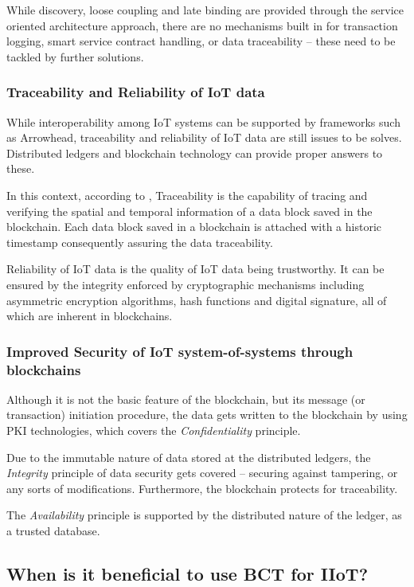 \documentclass[a4paper]{article}
\begin{document}
While discovery, loose coupling and late binding are provided through the service oriented architecture approach, there are no mechanisms built in for transaction logging, smart service contract handling, or data traceability -- these need to be tackled by further solutions.  

\subsubsection{Traceability and Reliability of IoT data}

While interoperability among IoT systems can be supported by frameworks such as Arrowhead, traceability and reliability of IoT data are still issues to be solves. Distributed ledgers and blockchain technology can provide proper answers to these.

In this context, according to \cite{BC_IoT_survey}, Traceability is the capability of tracing and verifying the spatial and temporal information of a data block saved in the blockchain. Each data block saved in a blockchain is attached with a historic timestamp consequently assuring the data traceability. 

Reliability of IoT data \cite{BC_IoT_survey} is the quality of IoT data being trustworthy. It can be ensured by the integrity enforced by cryptographic mechanisms including asymmetric encryption algorithms, hash functions and digital signature, all of which are inherent in blockchains.

\subsubsection{Improved Security of IoT system-of-systems through blockchains}
Although it is not the basic feature of the blockchain, but its message (or transaction) initiation procedure, the data gets written to the blockchain by using PKI technologies, which covers the \emph{Confidentiality} principle.

Due to the immutable nature of data stored at the distributed ledgers, the \emph{Integrity} principle of data security gets covered -- securing against tampering, or any sorts of modifications. Furthermore, the blockchain protects for traceability.

The \emph{Availability} principle is supported by the distributed nature of the ledger, as a trusted database.

\subsection{When is it beneficial to use BCT for IIoT?}
\end{document}
